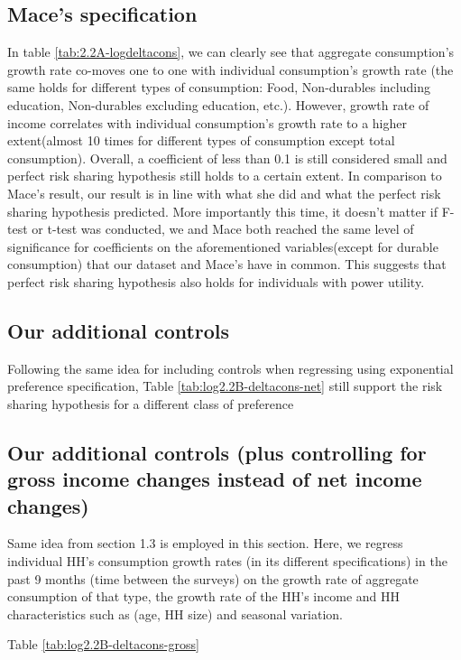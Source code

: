 \documentclass[12pt,a4paper]{article}
\begin{document}
\subsection{Mace's specification}

In table \ref{tab:2.2A-logdeltacons}, we can clearly see that aggregate consumption's growth rate co-moves one to one with individual consumption's growth rate (the same holds for different types of consumption: Food, Non-durables including education, Non-durables excluding education, etc.). However,  growth rate of income correlates with individual consumption's growth rate to a higher extent(almost 10 times for different types of consumption except total consumption). Overall, a coefficient of less than 0.1 is still considered small and perfect risk sharing hypothesis still holds to a certain extent. In comparison to Mace's result, our result is in line with what she did and what the perfect risk sharing hypothesis predicted. More importantly this time, it doesn't matter if F-test or t-test was conducted, we and Mace both reached the same level of significance for coefficients on the aforementioned variables(except for durable consumption) that our dataset and Mace's have in common. This suggests that perfect risk sharing hypothesis also holds for individuals with power utility. 


\subsection{Our additional controls}

Following the same idea for including controls when regressing using exponential preference specification,  Table \ref{tab:log2.2B-deltacons-net} still support the risk sharing hypothesis for a different class of preference 


\subsection{Our additional controls (plus controlling for gross income changes instead of net income changes)}

Same idea from section 1.3 is employed in this section. Here, we regress individual HH's consumption growth rates (in its different specifications) in the past 9 months (time between the surveys) on the growth rate of aggregate consumption of that type, the growth rate of the HH's income and HH characteristics such as (age, HH size) and seasonal variation. 

Table \ref{tab:log2.2B-deltacons-gross}


\clearpage
{}


\end{document}
